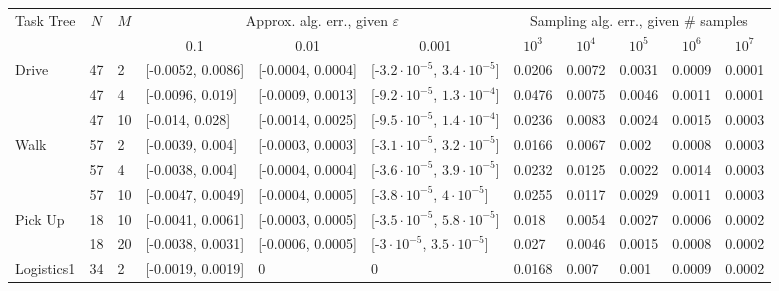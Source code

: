 \documentclass{article}
\begin{document}
\begin{table}[tbh!]
	{\footnotesize
		\begin{tabular}{|l|l|l|| p{1.5cm}|p{1.5cm}|p{1.8cm}||l|l|l|l|l|}
			\hline
			\multicolumn{1}{|c|}{\multirow{2}{*}{Task Tree}} & \multicolumn{1}{c|}{\multirow{2}{*}{$N$}} & \multicolumn{1}{c|}{\multirow{2}{*}{$M$}} & \multicolumn{3}{c|}{Approx. alg. err., given $\varepsilon$} & \multicolumn{5}{c|}{Sampling alg. err., given \# samples} \\ \cline{4-11} 
			\multicolumn{1}{|c|}{} & \multicolumn{1}{c|}{} & \multicolumn{1}{c|}{} & \multicolumn{1}{c|}{0.1} & \multicolumn{1}{c|}{0.01} & \multicolumn{1}{c|}{0.001} & \multicolumn{1}{c|}{$10^{3}$} & \multicolumn{1}{c|}{$10^{4}$} & \multicolumn{1}{c|}{$10^{5}$} & \multicolumn{1}{c|}{$10^{6}$} & \multicolumn{1}{c|}{$10^{7}$} \\ \hline \hline
			\multirow{3}{*}{Drive} & 47 & 2 & [-0.0052, 0.0086] & [-0.0004, 0.0004] & [-$3.2 {\cdot} 10^{-5}$, $3.4 {\cdot} 10^{-5}$] & 0.0206 & 0.0072 & 0.0031 & 0.0009 & 0.0001 \\ \cline{2-11} 
			& 47 & 4 & [-0.0096, 0.019] & [-0.0009, 0.0013] & [-$9.2 {\cdot} 10^{-5}$, $1.3 {\cdot} 10^{-4}$] & 0.0476 & 0.0075 & 0.0046 & 0.0011 & 0.0001 \\\cline{2-11} 
			& 47 & 10 & [-0.014, 0.028] & [-0.0014, 0.0025] & [-$9.5 {\cdot} 10^{-5}$, $1.4 {\cdot} 10^{-4}$] & 0.0236 & 0.0083 & 0.0024 & 0.0015 & 0.0003 \\ \hline
			\multirow{2}{*}{Walk} & 57 & 2 & [-0.0039, 0.004] & [-0.0003, 0.0003] & [-$3.1 {\cdot} 10^{-5}$, $3.2 {\cdot} 10^{-5}$] & 0.0166 & 0.0067 & 0.002 & 0.0008 & 0.0003 \\ \cline{2-11} 
			& 57 & 4 & [-0.0038, 0.004] & [-0.0004,  0.0004] & [-$3.6 {\cdot} 10^{-5}$, $3.9 {\cdot} 10^{-5}$] & 0.0232 & 0.0125 & 0.0022 & 0.0014 &  0.0003 \\ \cline{2-11} 
			& 57 & 10 & [-0.0047, 0.0049] & [-0.0004, 0.0005] & [-$3.8 {\cdot} 10^{-5}$, $4 {\cdot} 10^{-5}$] & 0.0255 & 0.0117 & 0.0029 & 0.0011  & 0.0003 \\ \hline
			\multirow{2}{*}{Pick Up} & 18 & 10 & {[}-0.0041, 0.0061{]} & {[}-0.0003, 0.0005{]} & {[}-$3.5 {\cdot} 10^{-5}$, $5.8 {\cdot} 10^{-5}${]} & 0.018 & 0.0054 & 0.0027 & 0.0006 & 0.0002 \\ \cline{2-11}
			& 18 & 20 & [-0.0038, 0.0031] & [-0.0006, 0.0005] & [-$3 {\cdot} 10^{-5}$, $3.5 {\cdot} 10^{-5}$] & 0.027 & 0.0046 & 0.0015  & 0.0008 & 0.0002 \\ \hline
			\multirow{2}{*}{Logistics1} & 34 & 2 & [-0.0019, 0.0019] & 0& 0& 0.0168 & 0.007 & 0.001 & 0.0009 & 0.0002 \\ \cline{2-11}  

\end{tabular}}
\end{table}
\end{document}
